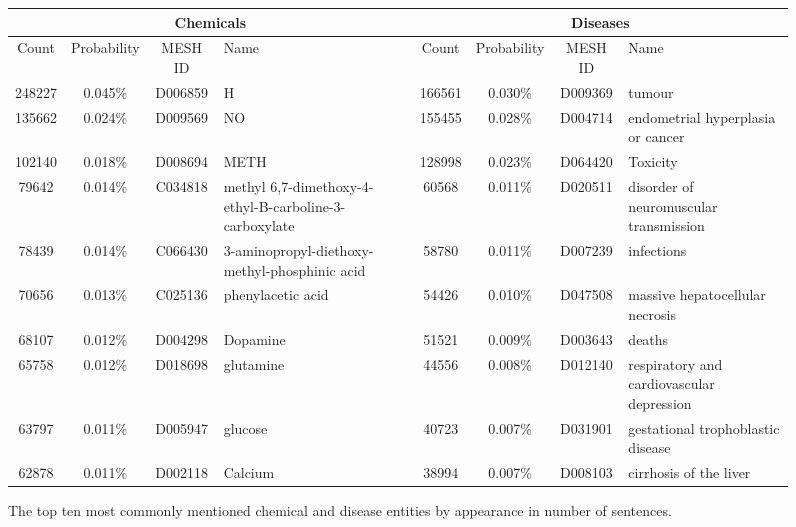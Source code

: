 \documentclass[10pt, oneside]{article}
\begin{document}
\begin{figure}[h]
\begin{center}
\fontsize{9}{11}\selectfont
\begin{tabular}{|*{3}{c|}p{2cm}||*{3}{c|}p{2cm}|}\hline
\multicolumn{4}{|c||}{\textbf{Chemicals}} & \multicolumn{4}{c|}{\textbf{Diseases}} \\ \hline 
Count & Probability & MESH ID & Name & Count & Probability & MESH ID & Name \\ \hline 
248227 & 0.045\% & D006859 & H & 166561 & 0.030\% & D009369 & tumour \\ \hline 
135662 & 0.024\% & D009569 & NO & 155455 & 0.028\% & D004714 & endometrial hyperplasia or cancer \\ \hline 
102140 & 0.018\% & D008694 & METH & 128998 & 0.023\% & D064420 & Toxicity \\ \hline 
79642 & 0.014\% & C034818 & methyl 6,7-dimethoxy-4-ethyl-B-carboline-3-carboxylate & 60568 & 0.011\% & D020511 & disorder of neuromuscular transmission \\ \hline 
78439 & 0.014\% & C066430 & 3-aminopropyl-diethoxy-methyl-phosphinic acid & 58780 & 0.011\% & D007239 & infections \\ \hline 
70656 & 0.013\% & C025136 & phenylacetic acid & 54426 & 0.010\% & D047508 & massive hepatocellular necrosis \\ \hline 
68107 & 0.012\% & D004298 & Dopamine & 51521& 0.009\% & D003643 & deaths \\ \hline 
65758 & 0.012\% & D018698 & glutamine & 44556 & 0.008\% & D012140 & respiratory and cardiovascular depression \\ \hline 
63797 & 0.011\% & D005947 & glucose & 40723 & 0.007\% & D031901 & gestational trophoblastic disease \\ \hline 
62878 & 0.011\% & D002118 & Calcium & 38994 & 0.007\% & D008103  & cirrhosis of the liver \\ \hline 
\end{tabular}
\caption{\label{fig:popular-individuals} The top ten most commonly mentioned chemical and disease entities by appearance in number of sentences.}
\end{center}
\end{figure}
\end{document}
